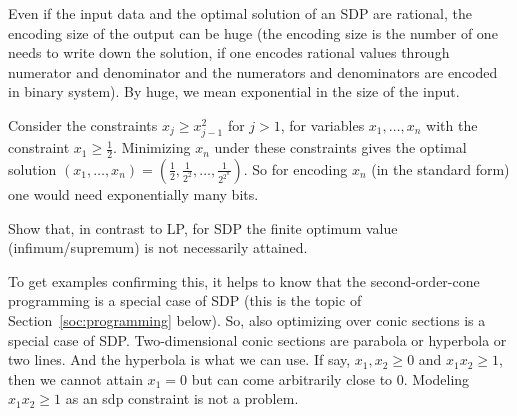 \begin{exercise}
	Even if the input data and the optimal solution of an SDP are rational, the encoding size of the output can be huge (the encoding size is the number of  one needs to write down the solution, if one encodes rational values through numerator and denominator and the numerators and denominators are encoded in binary system). By huge, we mean exponential in the size of the input. 
\end{exercise}
\begin{solution}
	Consider the constraints $x_j \ge x_{j-1}^2$ for $j > 1$, for variables $x_1,\ldots,x_n$ with the constraint $x_1 \ge \frac{1}{2}$. Minimizing $x_n$ under these constraints gives the optimal solution $(x_1,\ldots,x_n) = (\frac{1}{2}, \frac{1}{2^2},\ldots,\frac{1}{2^{2^n}})$. So for encoding $x_n$ (in the standard form) one would need exponentially many bits. 
\end{solution}

\begin{exercise}
	Show that, in contrast to LP, for SDP the finite optimum value (infimum/supremum) is not necessarily attained. 
\end{exercise}
\begin{solution}
	To get examples confirming this, it helps to know that the second-order-cone programming is a special case of SDP (this is the topic of Section~\ref{soc:programming} below). So, also optimizing over conic sections is a special case of SDP. Two-dimensional conic sections are parabola or hyperbola or two lines. And the hyperbola is what we can use. If say, $x_1, x_2 \ge 0$ and $x_1 x_2 \ge 1$, then we cannot attain $x_1=0$ but can come arbitrarily close to $0$. Modeling $x_1 x_2 \ge 1$ as an sdp constraint is not a problem. 
\end{solution}


